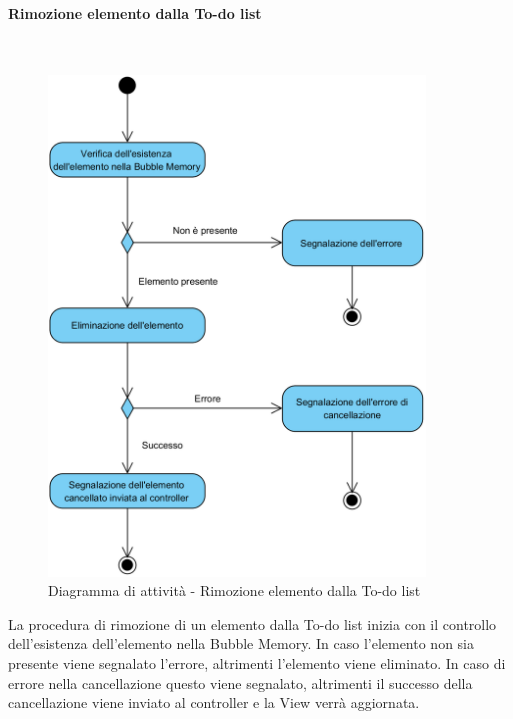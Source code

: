 \paragraph{Rimozione elemento dalla To-do list}\mbox{}\\
\nopagebreak
\begin{figure}[H]
	\centering
	\includegraphics[width=10cm]{../../documenti/SpecificaTecnica/diagrammi_img/attivita/removeelementtodolist.png}
	\caption{Diagramma di attività - Rimozione elemento dalla To-do list}
\end{figure}
La procedura di rimozione di un elemento dalla To-do list inizia con il controllo dell'esistenza dell'elemento nella Bubble Memory. In caso l'elemento non sia presente viene segnalato l'errore, altrimenti l'elemento viene eliminato. In caso di errore nella cancellazione questo viene segnalato, altrimenti il successo della cancellazione viene inviato al controller e la View verrà aggiornata.

